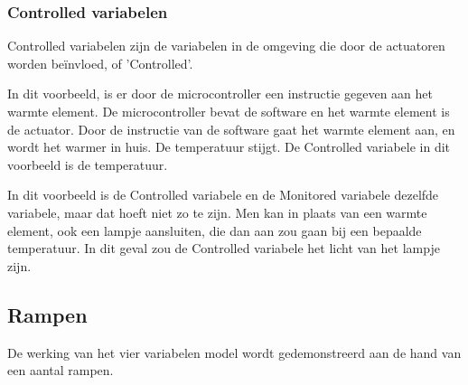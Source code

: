 \documentclass{article}
\begin{document}
			\subsubsection{Controlled variabelen}

			Controlled variabelen zijn de variabelen in de omgeving die door de actuatoren worden beïnvloed, of 'Controlled'.

			In dit voorbeeld, is er door de microcontroller een instructie gegeven aan het warmte element. De microcontroller bevat de software en het warmte element is de actuator. Door de instructie van de software gaat het warmte element aan, en wordt het warmer in huis. De temperatuur stijgt. De Controlled variabele in dit voorbeeld is de temperatuur.

			
			In dit voorbeeld is de Controlled variabele en de Monitored variabele dezelfde variabele, maar dat hoeft niet zo te zijn. Men kan in plaats van een warmte element, ook een lampje aansluiten, die dan aan zou gaan bij een bepaalde temperatuur. In dit geval zou de Controlled variabele het licht van het lampje zijn.
		
		\subsection{Rampen}
		
		De werking van het vier variabelen model wordt gedemonstreerd aan de hand van een aantal rampen.
		
\end{document}
